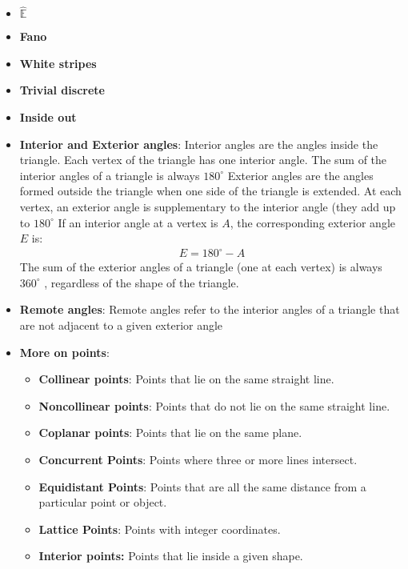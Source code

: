 \documentclass{report}
\begin{document}
\begin{itemize}
        \item \textbf{$\hat{\mathbb{E}}$}
        \item \textbf{Fano}
        \item \textbf{White stripes}
        \item \textbf{Trivial discrete}
        \item \textbf{Inside out}
        \item \textbf{Interior and Exterior angles}: Interior angles are the angles inside the triangle. Each vertex of the triangle has one interior angle. The sum of the interior angles of a triangle is always $180^{\circ}$
            \bigbreak \noindent 
            Exterior angles are the angles formed outside the triangle when one side of the triangle is extended.
            At each vertex, an exterior angle is supplementary to the interior angle (they add up to $180^{\circ} $
            \bigbreak \noindent 
            If an interior angle at a vertex is $A$, the corresponding exterior angle $E$ is:
            \begin{align*}
                E = 180^{\circ} - A
            \end{align*}
            \bigbreak \noindent 
            The sum of the exterior angles of a triangle (one at each vertex) is always $360^{\circ}$ , regardless of the shape of the triangle.
        \item \textbf{Remote angles}: Remote angles refer to the interior angles of a triangle that are not adjacent to a given exterior angle
        \item \textbf{More on points}:
            \begin{itemize}
                \item \textbf{Collinear points}: Points that lie on the same straight line.
                \item \textbf{Noncollinear points}: Points that do not lie on the same straight line.
                \item \textbf{Coplanar points}: Points that lie on the same plane.
                \item \textbf{Concurrent Points}: Points where three or more lines intersect.
                \item \textbf{Equidistant Points}: Points that are all the same distance from a particular point or object.
                \item \textbf{Lattice Points}:  Points with integer coordinates.
                \item \textbf{Interior points:} Points that lie inside a given shape.

\end{itemize}
\end{itemize}
\end{document}
